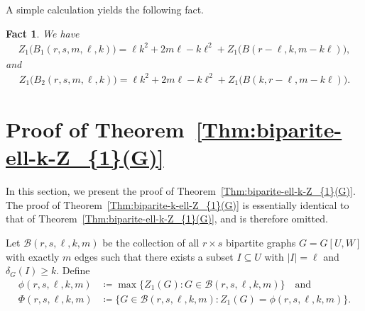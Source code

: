 \documentclass[11pt,a4paper]{article}
\newtheorem{fact}[definition]{Fact}
\begin{document}
A simple calculation yields the following fact. 

\begin{fact}\label{FACT:Z_1(B_1)-and-Z_1(B_2)}
    We have 
    \begin{align*}
    Z_{1} \big(B_1(r,s,m,\ell,k)\big) 
    = \ell k^2 + 2m \ell - k \ell^2 + Z_{1}\big( B(r-\ell, k, m - k\ell) \big), 
    \end{align*}
    and
    \begin{align*}
    Z_{1} \big(B_2(r,s,m,\ell,k)\big) 
    = \ell k^2 + 2m \ell - k \ell^2 + Z_{1}\big( B(k, r-\ell, m - k\ell) \big).
    \end{align*}
\end{fact}

\section{Proof of Theorem~\ref{Thm:biparite-ell-k-Z_{1}(G)}}\label{SEC:proof-bipartite}
%
In this section, we present the proof of Theorem~\ref{Thm:biparite-ell-k-Z_{1}(G)}. 
The proof of Theorem~\ref{Thm:biparite-k-ell-Z_{1}(G)} is essentially identical to that of Theorem~\ref{Thm:biparite-ell-k-Z_{1}(G)}, and is therefore omitted. 

Let $\mathcal{B}(r,s,\ell, k,m)$ be the collection of all $r \times s$ bipartite graphs $G = G[U,W]$ with exactly $m$ edges such that there exists a subset $I \subseteq U$ with $|I| = \ell$ and $\delta_{G}(I) \ge k$. 
Define 
\begin{align*}
    \phi(r,s,\ell, k,m)
    & \coloneqq \max\big\{ Z_{1}(G) \colon G \in \mathcal{B}(r,s,\ell, k,m) \big\}  \quad\text{and}\quad \\[0.3em]
    \Phi(r,s,\ell, k,m)
    & \coloneqq \big\{ G \in \mathcal{B}(r,s,\ell, k,m) \colon Z_{1}(G) = \phi(r,s,\ell, k,m) \big\}. 
\end{align*}
\end{document}
